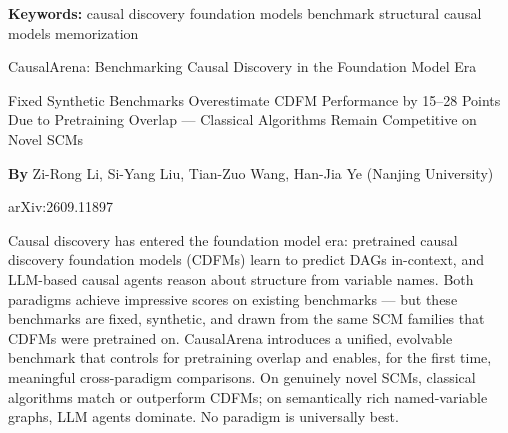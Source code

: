 \documentclass[10pt,twocolumn]{article}
\begin{document}
\setlength{\parindent}{0pt}
\setlength{\parskip}{4pt}

{\small\color{keywordgray}\textbf{Keywords:}
  causal discovery \textbullet{}
  foundation models \textbullet{}
  benchmark \textbullet{}
  structural causal models \textbullet{}
  memorization}\par\vspace{4pt}

{\LARGE\bfseries\raggedright
  CausalArena: Benchmarking Causal
  Discovery in the Foundation Model Era}\par\vspace{4pt}

{\large\itshape\raggedright
  Fixed Synthetic Benchmarks Overestimate CDFM Performance by
  15--28 Points Due to Pretraining Overlap ---
  Classical Algorithms Remain Competitive on Novel SCMs}\par\vspace{6pt}

{\small\textbf{By} Zi-Rong Li, Si-Yang Liu,
  Tian-Zuo Wang, Han-Jia Ye
  (Nanjing University)}\par\vspace{2pt}

{\small\color{keywordgray}arXiv:2609.11897}
\par\vspace{2pt}\noindent{\color{rulered}\rule{\columnwidth}{0.6pt}}\vspace{6pt}

Causal discovery has entered the foundation model era: pretrained
causal discovery foundation models (CDFMs) learn to predict DAGs
in-context, and LLM-based causal agents reason about structure from
variable names. Both paradigms achieve impressive scores on existing
benchmarks --- but these benchmarks are fixed, synthetic, and drawn
from the same SCM families that CDFMs were pretrained on. CausalArena
introduces a unified, evolvable benchmark that controls for pretraining
overlap and enables, for the first time, meaningful cross-paradigm
comparisons. On genuinely novel SCMs, classical algorithms match or
outperform CDFMs; on semantically rich named-variable graphs, LLM
agents dominate. No paradigm is universally best.
\end{document}
